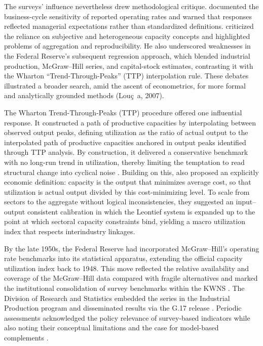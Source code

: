 \documentclass[11pt]{article}
\begin{document}
The surveys' influence nevertheless drew methodological critique. \citet{butler1958} documented the business-cycle sensitivity of reported operating rates and warned that responses reflected managerial expectations rather than standardized definitions. \citet{phillips1963} criticized the reliance on subjective and heterogeneous capacity concepts and highlighted problems of aggregation and reproducibility. He also underscored weaknesses in the Federal Reserve's subsequent regression approach, which blended industrial production, McGraw--Hill series, and capital-stock estimates, contrasting it with the Wharton ``Trend-Through-Peaks'' (TTP) interpolation rule. These debates illustrated a broader search, amid the ascent of econometrics, for more formal and analytically grounded methods (Lou{\c{c}}{~a}, 2007).

The Wharton Trend-Through-Peaks (TTP) procedure offered one influential response. It constructed a path of productive capacities by interpolating between observed output peaks, defining utilization as the ratio of actual output to the interpolated path of productive capacities anchored in output peaks identified through TTP analysis. By construction, it delivered a conservative benchmark with no long-run trend in utilization, thereby limiting the temptation to read structural change into cyclical noise \citep{kleinsummers1967}. Building on this, \citet{kleindavid1958} also proposed an explicitly economic definition: capacity is the output that minimizes average cost, so that utilization is actual output divided by this cost-minimizing level. To scale from sectors to the aggregate without logical inconsistencies, they suggested an input--output consistent calibration in which the Leontief system is expanded up to the point at which sectoral capacity constraints bind, yielding a macro utilization index that respects interindustry linkages.

By the late 1950s, the Federal Reserve had incorporated McGraw--Hill's operating rate benchmarks into its statistical apparatus, extending the official capacity utilization index back to 1948. This move reflected the relative availability and coverage of the McGraw--Hill data compared with fragile alternatives and marked the institutional consolidation of survey benchmarks within the KWNS \citep{jessop2002}. The Division of Research and Statistics embedded the series in the Industrial Production program and disseminated results via the G.17 release \citep{bogfrs2017}. Periodic assessments acknowledged the policy relevance of survey-based indicators while also noting their conceptual limitations and the case for model-based complements \citep{usgao1996}.
\end{document}
